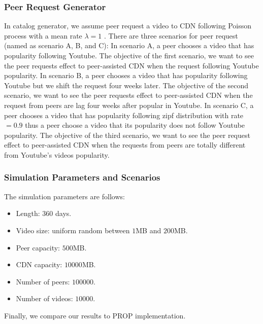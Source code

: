 \documentclass[10pt,final,journal,a4paper]{IEEEtran}
\begin{document}
\subsubsection{Peer Request Generator}\label{peerrequest}
In catalog generator, we assume peer request a video to CDN following Poisson process with a mean rate $\lambda=1$ \cite{Zink:2009:CYN:1502814.1502987}.
There are three scenarios for peer request (named as scenario A, B, and C):
In scenario A, a peer chooses a video that has popularity following Youtube.
The objective of the first scenario, we want to see the peer requests effect to peer-assisted CDN when the request following Youtube popularity. 
In scenario B, a peer chooses a video that has popularity following Youtube but we shift the request four weeks later.  
The objective of the second scenario, we want to see the peer requests effect to peer-assisted CDN when the request from peers are lag four weeks after popular in Youtube.
In scenario C, a peer chooses a video that has popularity following zipf distribution with rate$=0.9$ \cite{6654887} thus a peer choose a video that its popularity does not follow Youtube popularity.
The objective of the third scenario, we want to see the peer request effect to peer-assisted CDN when the requests from peers are totally different from Youtube's videos popularity.



\subsubsection{Simulation Parameters and Scenarios}
The simulation parameters are follows:

\begin{itemize}
\item Length: $360$ days.
\item Video size: uniform random between $1$MB and $200$MB.
\item Peer capacity: $500$MB.
\item CDN capacity: $10000$MB.
\item Number of peers: $100000$.
\item Number of videos: $10000$.
\end{itemize}
Finally, we compare our results to PROP \cite{1613869} implementation.
\end{document}
